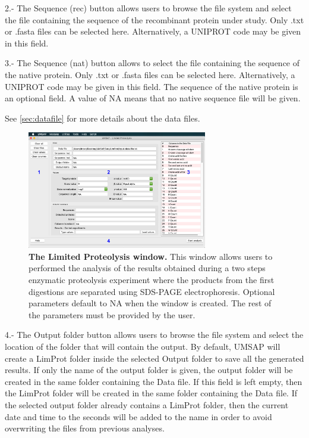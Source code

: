 \num{2}.- The Sequence (rec) button allows users to browse the file system and select the file containing the sequence of the recombinant protein under study. Only .txt or .fasta files can be selected here. Alternatively,  a UNIPROT code may be given in this field.

\num{3}.- The Sequence (nat) button allows to select the file containing the sequence of the native protein. Only .txt or .fasta files can be selected here. Alternatively, a UNIPROT code may be given in this field. The sequence of the native protein is an optional field. A value of NA means that no native sequence file will be given. 

See \autoref{sec:datafile} for more details about the data files.

\begin{figure}[h]
	\centering
	\includegraphics[width=0.7\textwidth]{./IMAGES/MOD-LIMPROT/limprot-mod.jpg}
	\caption[The Limited Proteolysis window]{\textbf{The Limited Proteolysis window.} This window allows users to performed the analysis of the results obtained during a two steps enzymatic proteolysis experiment where the products from the first digestions are separated using SDS-PAGE electrophoresis. Optional parameters default to NA when the window is created. The rest of the parameters must be provided by the user.} 
	\label{fig:enzdigmw}
	\vspace{-5pt} 	
\end{figure} 

\num{4}.- The Output folder\label{par:limprotOutFolder} button allows users to browse the file system and select the location of the folder that will contain the output. By default, UMSAP will create a LimProt folder inside the selected Output folder to save all the generated results. If only the name of the output folder is given, the output folder will be created in the same folder containing the Data file. If this field is left empty, then the LimProt folder will be created in the same folder containing the Data file. If the selected output folder already contains a LimProt folder, then the current date and time to the seconds will be added to the name in order to avoid overwriting the files from previous analyses.

